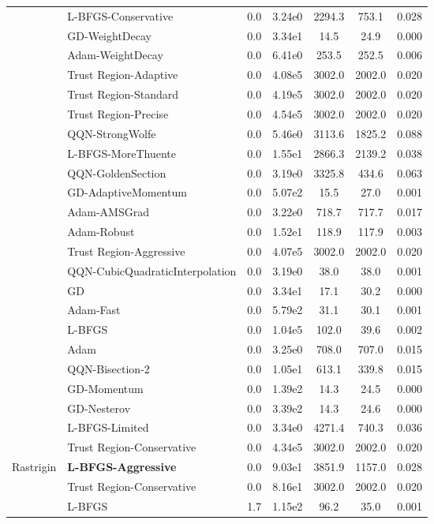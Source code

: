 \documentclass{article}
\begin{document}
\begin{table}[htbp]
{\begin{tabular}{p{2.5cm}p{2.5cm}*{5}{c}}
 & L-BFGS-Conservative & 0.0 & 3.24e0 & 2294.3 & 753.1 & 0.028 \\
 & GD-WeightDecay & 0.0 & 3.34e1 & 14.5 & 24.9 & 0.000 \\
 & Adam-WeightDecay & 0.0 & 6.41e0 & 253.5 & 252.5 & 0.006 \\
 & Trust Region-Adaptive & 0.0 & 4.08e5 & 3002.0 & 2002.0 & 0.020 \\
 & Trust Region-Standard & 0.0 & 4.19e5 & 3002.0 & 2002.0 & 0.020 \\
 & Trust Region-Precise & 0.0 & 4.54e5 & 3002.0 & 2002.0 & 0.020 \\
 & QQN-StrongWolfe & 0.0 & 5.46e0 & 3113.6 & 1825.2 & 0.088 \\
 & L-BFGS-MoreThuente & 0.0 & 1.55e1 & 2866.3 & 2139.2 & 0.038 \\
 & QQN-GoldenSection & 0.0 & 3.19e0 & 3325.8 & 434.6 & 0.063 \\
 & GD-AdaptiveMomentum & 0.0 & 5.07e2 & 15.5 & 27.0 & 0.001 \\
 & Adam-AMSGrad & 0.0 & 3.22e0 & 718.7 & 717.7 & 0.017 \\
 & Adam-Robust & 0.0 & 1.52e1 & 118.9 & 117.9 & 0.003 \\
 & Trust Region-Aggressive & 0.0 & 4.07e5 & 3002.0 & 2002.0 & 0.020 \\
 & QQN-CubicQuadraticInterpolation & 0.0 & 3.19e0 & 38.0 & 38.0 & 0.001 \\
 & GD & 0.0 & 3.34e1 & 17.1 & 30.2 & 0.000 \\
 & Adam-Fast & 0.0 & 5.79e2 & 31.1 & 30.1 & 0.001 \\
 & L-BFGS & 0.0 & 1.04e5 & 102.0 & 39.6 & 0.002 \\
 & Adam & 0.0 & 3.25e0 & 708.0 & 707.0 & 0.015 \\
 & QQN-Bisection-2 & 0.0 & 1.05e1 & 613.1 & 339.8 & 0.015 \\
 & GD-Momentum & 0.0 & 1.39e2 & 14.3 & 24.5 & 0.000 \\
 & GD-Nesterov & 0.0 & 3.39e2 & 14.3 & 24.6 & 0.000 \\
 & L-BFGS-Limited & 0.0 & 3.34e0 & 4271.4 & 740.3 & 0.036 \\
 & Trust Region-Conservative & 0.0 & 4.34e5 & 3002.0 & 2002.0 & 0.020 \\
\midrule
\multirow{25}{*}{Rastrigin} & \textbf{L-BFGS-Aggressive} & 0.0 & 9.03e1 & 3851.9 & 1157.0 & 0.028 \\
 & Trust Region-Conservative & 0.0 & 8.16e1 & 3002.0 & 2002.0 & 0.020 \\
 & L-BFGS & 1.7 & 1.15e2 & 96.2 & 35.0 & 0.001 \\

\end{tabular}}
\end{table}
\end{document}
